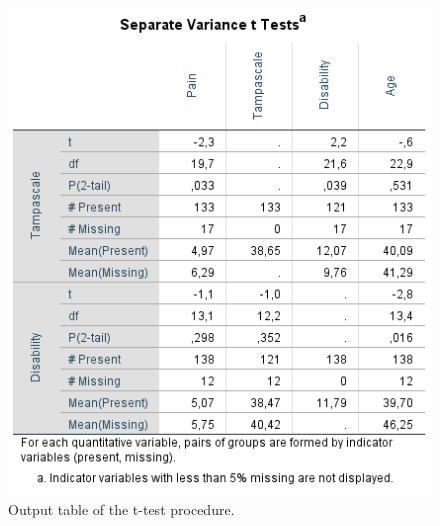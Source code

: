 \documentclass[]{book}
\begin{document}
\begin{figure}

{\centering \includegraphics[width=0.7\linewidth]{images/tab2.5} 

}

\caption{Output table of the t-test procedure.}\label{fig:tab2-5}
\end{figure}
\end{document}
